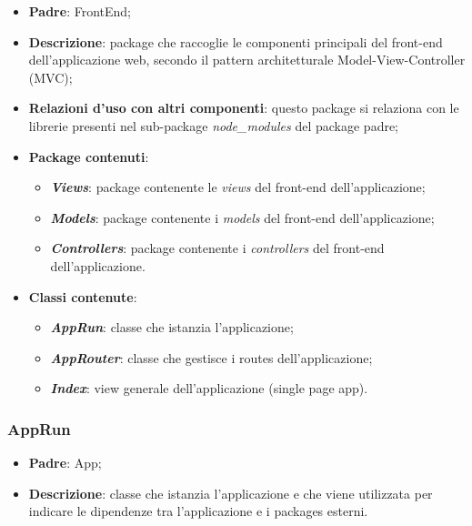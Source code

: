 \begin{itemize}
	\item \textbf{Padre}: FrontEnd;
	
	\item \textbf{Descrizione}: package che raccoglie le componenti principali del front-end dell'applicazione web, secondo il pattern architetturale Model-View-Controller (MVC);
	
	\item \textbf{Relazioni d’uso con altri componenti}: questo package si relaziona con le librerie presenti nel sub-package \textit{node\_modules} del package padre;
	
	\item \textbf{Package contenuti}:
	\begin{itemize}
		\item \textbf{\textit{Views}}: package contenente le \textit{views} del front-end dell'applicazione;
		
		\item \textbf{\textit{Models}}: package contenente i \textit{models} del front-end dell'applicazione;
		
		\item \textbf{\textit{Controllers}}: package contenente i \textit{controllers} del front-end dell'applicazione.
	\end{itemize}
	\item \textbf{Classi contenute}:
	\begin{itemize}
		
		\item \textbf{\textit{AppRun}}: classe che istanzia l'applicazione;
		
		\item \textbf{\textit{AppRouter}}: classe che gestisce i routes dell'applicazione;
		
		\item \textbf{\textit{Index}}: view generale dell'applicazione (single page app).
	\end{itemize}
\end{itemize}

\subsubsection{AppRun}

\begin{itemize}
	\item \textbf{Padre}: App;
	
	\item \textbf{Descrizione}: classe che istanzia l'applicazione e che viene utilizzata per indicare le dipendenze tra l'applicazione e i packages esterni.
\end{itemize}

